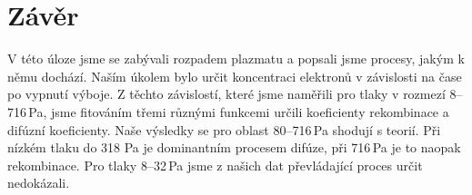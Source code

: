 \documentclass[a4paper,12pt]{article}
\begin{document}
\section{Závěr}
V této úloze jsme se zabývali rozpadem plazmatu a popsali jsme procesy, jakým k 
němu dochází. Naším úkolem bylo určit koncentraci elektronů v závislosti na 
čase po vypnutí výboje. Z těchto závislostí, které jsme naměřili pro 
tlaky v rozmezí 8--716\,Pa, jsme fitováním třemi různými funkcemi určili 
koeficienty rekombinace a difúzní koeficienty. Naše výsledky se pro oblast 
80--716\,Pa shodují s teorií. Při nízkém tlaku do 318 Pa je dominantním 
procesem difúze, při 716\,Pa je to naopak rekombinace. Pro tlaky 8--32\,Pa jsme 
z našich dat převládající proces určit nedokázali.
\end{document}
